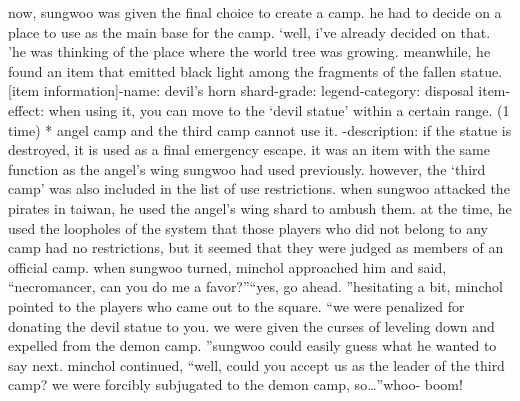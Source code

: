 now, sungwoo was given the final choice to create a camp.
 he had to decide on a place to use as the main base for the camp.
‘well, i’ve already decided on that.
’he was thinking of the place where the world tree was growing.
meanwhile, he found an item that emitted black light among the fragments of the fallen statue.
[item information]-name: devil’s horn shard-grade: legend-category: disposal item-effect: when using it, you can move to the ‘devil statue’ within a certain range.
 (1 time) * angel camp and the third camp cannot use it.
-description: if the statue is destroyed, it is used as a final emergency escape.
it was an item with the same function as the angel’s wing sungwoo had used previously.
 however, the ‘third camp’ was also included in the list of use restrictions.
when sungwoo attacked the pirates in taiwan, he used the angel’s wing shard to ambush them.
at the time, he used the loopholes of the system that those players who did not belong to any camp had no restrictions, but it seemed that they were judged as members of an official camp.
when sungwoo turned, minchol approached him and said, “necromancer, can you do me a favor?”“yes, go ahead.
”hesitating a bit, minchol pointed to the players who came out to the square.
“we were penalized for donating the devil statue to you.
 we were given the curses of leveling down and expelled from the demon camp.
”sungwoo could easily guess what he wanted to say next.
minchol continued, “well, could you accept us as the leader of the third camp? we were forcibly subjugated to the demon camp, so…”whoo- boom!

